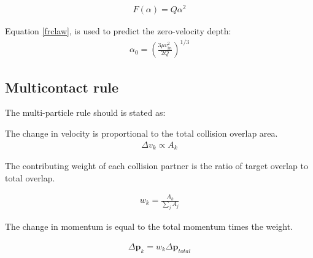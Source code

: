 \begin{equation}
\begin{aligned}
\label{frclaw}
F(\alpha) = Q\alpha^2
\end{aligned}
\end{equation}

Equation \ref{frclaw}, is used to predict the zero-velocity depth: 
\begin{equation}
\begin{aligned}
\label{zerodepth}
\alpha_0 =
\left(\frac{3\mu v_{in}^2}{2Q}\right)^{1/3}
\end{aligned}
\end{equation}


\subsection{Multicontact rule}

The multi-particle rule should is stated as:

The change in velocity is proportional to the total collision overlap area. 
\begin{equation}
\begin{aligned}
\label{mc}
\Delta v_k \propto A_k
\end{aligned}
\end{equation}

The contributing weight of each collision partner is the ratio of target overlap to total overlap.

\begin{equation}
\begin{aligned}
\label{mc}
w_k = \frac{A_k}{\sum_j A_j}
\end{aligned}
\end{equation}

The change in momentum is equal to the total momentum times the weight.

\begin{equation}
\begin{aligned}
\label{mca}
\Delta \mathbf{p}_k = w_k \Delta \mathbf{p}_{total}
\end{aligned}
\end{equation}
